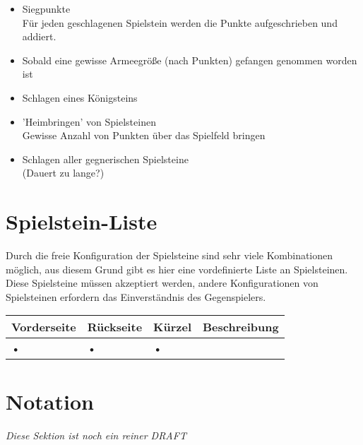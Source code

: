 \documentclass{article}
\begin{document}
	\begin{itemize}
	\item Siegpunkte \\
		  Für jeden geschlagenen Spielstein werden die Punkte aufgeschrieben und addiert.

	
	\item Sobald eine gewisse Armeegröße (nach Punkten) gefangen genommen worden ist
	
	\item Schlagen eines Königsteins
	
	\item 'Heimbringen' von Spielsteinen \\
	       Gewisse Anzahl von Punkten über das Spielfeld bringen
	
	\item Schlagen aller gegnerischen Spielsteine \\
	      (Dauert zu lange?)	
	\end{itemize}


\section{Spielstein-Liste}
	
	Durch die freie Konfiguration der Spielsteine sind sehr viele Kombinationen möglich, 
	aus diesem Grund gibt es hier eine vordefinierte Liste an Spielsteinen. Diese Spielsteine
	müssen akzeptiert werden, andere Konfigurationen von Spielsteinen erfordern das Einverständnis
	des Gegenspielers.
	
	\begin{tabular}{llll}
	\hline
	Vorderseite & Rückseite & Kürzel & Beschreibung \\ \hline
	• & • & • \\ 
	\hline
	\end{tabular} 

\section{Notation}

\textit{Diese Sektion ist noch ein reiner DRAFT}
\end{document}
